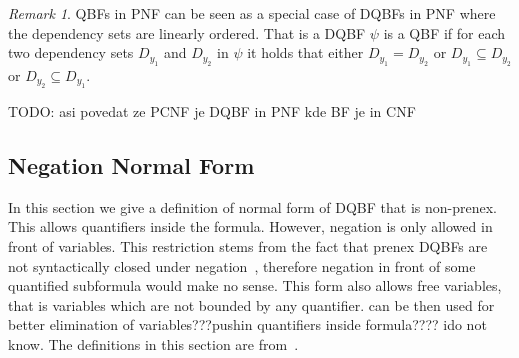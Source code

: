 \documentclass[
  digital, %
  twoside, %
  table,   %
  nolof,     %
  nolot,     %
]{fithesis3}
\theoremstyle{definition}
\theoremstyle{remark}
\newtheorem*{remark}{Remark}
\begin{document}
\begin{remark}
QBFs in PNF can be seen as a special case of DQBFs in PNF where the dependency sets are linearly ordered. That is a DQBF $\psi$ is a QBF if for each two dependency sets $D_{y_1}$ and $D_{y_2}$ in $\psi$ it holds that either $D_{y_1} = D_{y_2}$ or $D_{y_1} \subseteq D_{y_2}$ or $D_{y_2} \subseteq D_{y_1}$.
\end{remark}

TODO: asi povedat ze PCNF je DQBF in PNF kde BF je in CNF

\subsection{Negation Normal Form}

In this section we give a definition of normal form of DQBF that is non-prenex. This allows quantifiers inside the formula. However, negation is only allowed in front of variables. This restriction stems from the fact that prenex DQBFs are not syntactically closed under negation~\cite{NegationOfDQBFs}, therefore negation in front of some quantified subformula would make no sense. This form also allows free variables, that is variables which are not bounded by any quantifier. can be then used for better elimination of variables???pushin quantifiers inside formula???? ido not know. The definitions in this section are from~\cite{HQSquantifierLocalization}.
\end{document}

